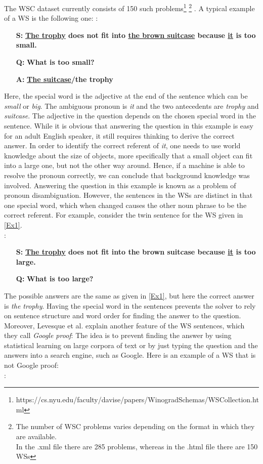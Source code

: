 The WSC dataset currently consists of 150 such problems\footnote{https://cs.nyu.edu/faculty/davise/papers/WinogradSchemas/WSCollection.html} \footnote{The number of WSC problems varies depending on the format in which they are available.\\In the .xml file there are 285 problems, whereas in the .html file there are 150 WSs} .
A typical example of a WS is the following one:
:
\begin{itemize} 
	\item[\textbf{S:}] \textbf{\underline{The trophy} does not fit into \underline{the brown suitcase} because \underline{it} is too small.}
	\item[\textbf{Q:}] \textbf{What is too small?}
	\item[\textbf{A:}] \textbf{\underline{The suitcase}/the trophy}
\end{itemize}

Here, the special word is the adjective at the end of the sentence which can be \textit{small} or \textit{big}. The ambiguous pronoun is \textit{it} and the two antecedents are \textit{trophy} and \textit{suitcase}. The adjective in the question depends on the chosen special word in the sentence. While it is obvious that answering the question in this example is easy for an adult English speaker, it still requires thinking to derive the correct answer. In order to identify the correct referent of \textit{it}, one needs to use world knowledge about the size of objects, more specifically that a small object can fit into a large one, but not the other way around. Hence, if a machine is able to resolve the pronoun correctly, we can conclude that background knowledge was involved. Answering the question in this example is known as a problem of pronoun disambiguation. However, the sentences in the WSs are distinct in that one special word, which when changed causes the other noun phrase to be the correct referent. For example, consider the twin sentence for the WS given in \ref{Ex1}.\\
:
\begin{itemize} 
	\item[\textbf{S:}] \textbf{\underline{The trophy} does not fit into the brown suitcase because \underline{it} is too large.}
	\item[\textbf{Q:}] \textbf{What is too large?}
\end{itemize}

The possible answers are the same as given in \ref{Ex1}, but here the correct answer is \textit{the trophy}. Having the special word in the sentences prevents the solver to rely on sentence structure and word order for finding the answer to the question. 
Moreover, Levesque et al. \cite{DBLP:conf/kr/LevesqueDM12} explain another feature of the WS sentences, which they call \textit{Google proof}: The idea is to prevent finding the answer by using statistical learning on large corpora of text or by just typing the question and the answers into a search engine, such as Google. 
Here is an example of a WS that is not Google proof:\\
:

